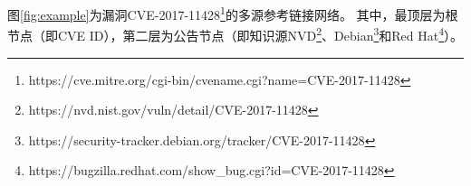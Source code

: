 
\begin{exmp}
图\ref{fig:example}为漏洞CVE-2017-11428\footnote{https://cve.mitre.org/cgi-bin/cvename.cgi?name=CVE-2017-11428}的多源参考链接网络。 其中，最顶层为根节点（即CVE ID），第二层为公告节点（即知识源NVD\footnote{https://nvd.nist.gov/vuln/detail/CVE-2017-11428}、Debian\footnote{https://security-tracker.debian.org/tracker/CVE-2017-11428}和Red Hat\footnote{https://bugzilla.redhat.com/show\_bug.cgi?id=CVE-2017-11428}）。
\end{exmp}

